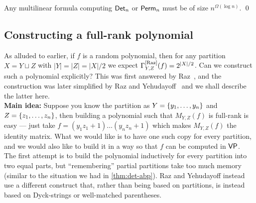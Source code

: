 \begin{theorem} Any multilinear formula computing $\operatorname{\mathsf{Det}}_n$ or $\operatorname{\mathsf{Perm}}_n$ must be of size $n^{\Omega(\log n)}$. \qed
\end{theorem}

\subsection{Constructing a full-rank polynomial}\label{sec:fullrankpoly}

As alluded to earlier,  if $f$ is a random polynomial, then for any partition $X = Y \sqcup Z$ with $|Y| = |Z| = |X|/2$ we expect $\Gamma^{\mathrm{[Raz]}}_{Y,Z}(f) = 2^{|X|/2}$. 
Can we construct such a polynomial explicitly? 
This was first answered by Raz~\cite{Raz06}, and the construction was later simplified by Raz and Yehudayoff~\cite{ry08} and we shall describe the latter here. \\

{\bf Main idea:} Suppose you know the partition as $Y = \left\{y_1,\dots, y_n\right\}$ and $Z = \left\{z_1,\dots, z_n\right\}$, then building a polynomial such that $M_{Y,Z}(f)$ is full-rank is easy --- just take $f = (y_1z_1 + 1)\dots (y_n z_n + 1)$ which makes $M_{Y,Z}(f)$ the identity matrix. 
What we would like is to have one such copy for every partition, and we would also like to build it in a way so that $f$ can be computed in $\mathsf{VP}$. \\

The first attempt is to build the polynomial inductively for every partition into two equal parts, but ``remembering'' partial partitions take too much memory (similar to the situation we had in \autoref{thm:det-abp}). 
Raz and Yehudayoff instead use a different construct that, rather than being based on partitions, is instead based on Dyck-strings or well-matched parentheses. 

